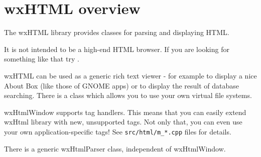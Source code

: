 \section{wxHTML overview}\label{wxhtml}

The wxHTML library provides classes for parsing and displaying HTML.

It is not intended to be a high-end HTML browser. If you are looking for
something like that try .

wxHTML can be used as a generic rich text viewer - for example to display 
a nice About Box (like those of GNOME apps) or to display the result of
database searching. There is a  
class which allows you to use your own virtual file systems.

wxHtmlWindow supports tag handlers. This means that you can easily
extend wxHtml library with new, unsupported tags. Not only that,
you can even use your own application-specific tags!
See {\tt src/html/m\_*.cpp} files for details.

There is a generic wxHtmlParser class,
independent of wxHtmlWindow.









